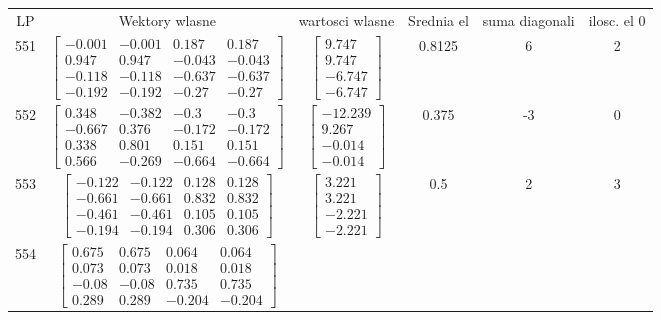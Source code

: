 \documentclass[a4paper,12pt]{article}
\begin{document}
\bgroup {} \vspace{0.2in} \begin{tabular}{c c c c c c}
LP &Wektory wlasne & wartosci wlasne & Srednia el & suma diagonali & ilosc. el 0\\
551
&
$\begin{bmatrix} -0.001 & -0.001 & 0.187 & 0.187 \\ 0.947 & 0.947 & -0.043 & -0.043 \\ -0.118 & -0.118 & -0.637 & -0.637 \\ -0.192 & -0.192 & -0.27 & -0.27 \end{bmatrix}$
&
$\begin{bmatrix} 9.747 \\ 9.747 \\ -6.747 \\ -6.747 \end{bmatrix}$
&
0.8125
&
6
&
2
\\
552
&
$\begin{bmatrix} 0.348 & -0.382 & -0.3 & -0.3 \\ -0.667 & 0.376 & -0.172 & -0.172 \\ 0.338 & 0.801 & 0.151 & 0.151 \\ 0.566 & -0.269 & -0.664 & -0.664 \end{bmatrix}$
&
$\begin{bmatrix} -12.239 \\ 9.267 \\ -0.014 \\ -0.014 \end{bmatrix}$
&
0.375
&
-3
&
0
\\
553
&
$\begin{bmatrix} -0.122 & -0.122 & 0.128 & 0.128 \\ -0.661 & -0.661 & 0.832 & 0.832 \\ -0.461 & -0.461 & 0.105 & 0.105 \\ -0.194 & -0.194 & 0.306 & 0.306 \end{bmatrix}$
&
$\begin{bmatrix} 3.221 \\ 3.221 \\ -2.221 \\ -2.221 \end{bmatrix}$
&
0.5
&
2
&
3
\\
554
&
$\begin{bmatrix} 0.675 & 0.675 & 0.064 & 0.064 \\ 0.073 & 0.073 & 0.018 & 0.018 \\ -0.08 & -0.08 & 0.735 & 0.735 \\ 0.289 & 0.289 & -0.204 & -0.204 \end{bmatrix}$

\end{tabular}
\end{document}
